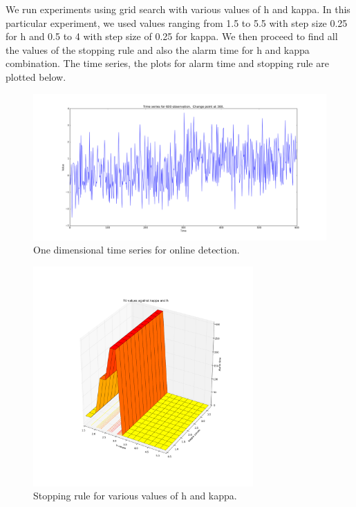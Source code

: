 \documentclass{article}
\begin{document}
We run experiments using grid search with various values of h and kappa.  In this particular experiment, we used values ranging from 1.5 to 5.5 with step size 0.25 for h and 0.5 to 4 with step size of 0.25 for kappa.  We then proceed to find all the values of the stopping rule and also the alarm time for h and kappa combination.  The time series, the plots for alarm time and stopping rule are plotted below.

\begin{figure}[ht!]
  \centering
  \includegraphics[width=1\textwidth]{images/1d_online/ts}
  \caption{One dimensional time series for online detection.\label{fig:1d_o_ts}}
\end{figure}

\begin{figure}[ht!]
  \centering
  \includegraphics[width=0.75\textwidth]{images/1d_online/time}
  \caption{Stopping rule for various values of h and kappa.\label{fig:1d_o_time}}
\end{figure}
\end{document}

